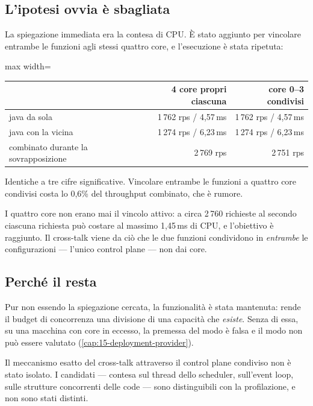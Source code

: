 \subsection{L'ipotesi ovvia \`e sbagliata}

La spiegazione immediata era la contesa di CPU. \`E stato aggiunto
 per vincolare entrambe le funzioni agli
stessi quattro core, e l'esecuzione \`e stata ripetuta:

\begin{center}
\small
\begin{adjustbox}{max width=\textwidth}
\begin{tabular}{@{}lrr@{}}
\toprule
 & \textbf{4 core propri ciascuna} & \textbf{core 0--3 condivisi} \\
\midrule
java da sola & 1\,762 rps / 4{,}57\,ms & 1\,762 rps / 4{,}57\,ms \\
java con la vicina & 1\,274 rps / 6{,}23\,ms & 1\,274 rps / 6{,}23\,ms \\
combinato durante la sovrapposizione & 2\,769 rps & 2\,751 rps \\
\bottomrule
\end{tabular}
\end{adjustbox}
\end{center}

Identiche a tre cifre significative. Vincolare entrambe le funzioni a quattro
core condivisi costa lo 0{,}6\% del throughput combinato, che \`e rumore.

I quattro core non erano mai il vincolo attivo: a circa 2\,760 richieste al
secondo ciascuna richiesta pu\`o costare al massimo 1{,}45\,ms di CPU, e
l'obiettivo \`e raggiunto. Il cross-talk viene da ci\`o che le due funzioni
condividono in \emph{entrambe} le configurazioni --- l'unico control plane ---
non dai core.

\subsection{Perch\'e il  resta}

Pur non essendo la spiegazione cercata, la funzionalit\`a \`e stata mantenuta:
rende il budget di concorrenza una divisione di una capacit\`a che
\emph{esiste}. Senza di essa, su una macchina con core in eccesso, la premessa
del modo  \`e falsa e il modo non pu\`o essere valutato
(\cref{cap:15-deployment-provider}).

\begin{damisurare}
Il meccanismo esatto del cross-talk attraverso il control plane condiviso non \`e
stato isolato. I candidati --- contesa sul thread dello scheduler, sull'event
loop, sulle strutture concorrenti delle code --- sono distinguibili con la
profilazione, e non sono stati distinti.
\end{damisurare}

